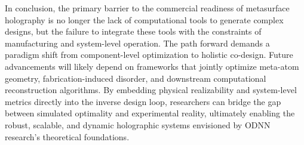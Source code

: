 \documentclass[11pt]{article}
\begin{document}
In conclusion, the primary barrier to the commercial readiness of metasurface holography is no longer the lack of computational tools to generate complex designs, but the failure to integrate these tools with the constraints of manufacturing and system-level operation. The path forward demands a paradigm shift from component-level optimization to holistic co-design. Future advancements will likely depend on frameworks that jointly optimize meta-atom geometry, fabrication-induced disorder, and downstream computational reconstruction algorithms. By embedding physical realizability and system-level metrics directly into the inverse design loop, researchers can bridge the gap between simulated optimality and experimental reality, ultimately enabling the robust, scalable, and dynamic holographic systems envisioned by ODNN research's theoretical foundations.



\end{document}
